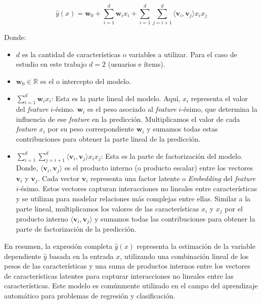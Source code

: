 \documentclass[11pt,a4paper,twoside]{thesis}
\begin{document}
\begin{equation}
	\hat{y}(x) = \mathbf{w}_0 + \sum_{i=1}^d \mathbf{w}_i x_i + \sum_{i=1}^d\sum_{j=i+1}^d
	\langle\mathbf{v}_i, \mathbf{v}_j\rangle x_i x_j
\end{equation}
\begin{description}
	\item[Donde:]
\end{description}
\begin{itemize}
	\item $d$ es la cantidad de características o variables a utilizar.
	      Para el caso de estudio en este trabajo $d=2$ (usuarios e ítems).
	\item $\mathbf{w}_0 \in \mathbb{R}$ es el  o intercepto del modelo.
	\item $\sum_{i=1}^d \mathbf{w}_i x_i$: Esta es la parte lineal del modelo. Aquí,
	      $x_i$ representa el valor del \textit{feature} $i$-ésimo. $\mathbf{w}_i$ es
	      el peso asociado al \textit{feature} $i$-ésimo, que determina la influencia
	      de ese \textit{feature} en la predicción. Multiplicamos el valor de cada
	      \textit{feature} $x_i$ por su peso correspondiente $\mathbf{w}_i$ y sumamos
	      todas estas contribuciones para obtener la parte lineal de la predicción.
	\item $\sum_{i=1}^d\sum_{j=i+1}^d \langle\mathbf{v}_i, \mathbf{v}_j\rangle x_i x_j$:
	      Esta es la parte de factorización del modelo. Donde, $\langle\mathbf{v}_i,
		      \mathbf{v}_j\rangle$ es el producto interno (o producto escalar) entre
	      los vectores $\mathbf{v}_i$ y $\mathbf{v}_j$. Cada vector $\mathbf{v}_i$
	      representa una factor latente o \textit{Embedding} del \textit{feature}
	      $i$-ésimo. Estos vectores capturan interacciones no lineales entre
	      características y se utilizan para modelar relaciones más complejas
	      entre ellas. Similar a la parte lineal, multiplicamos los valores
	      de las características $x_i$ y $x_j$ por el producto interno
	      $\langle\mathbf{v}_i, \mathbf{v}_j\rangle$ y sumamos todas las contribuciones
	      para obtener la parte de factorización de la predicción.

\end{itemize}

En resumen, la expresión completa $\hat{y}(x)$ representa la estimación de la
variable dependiente $\hat{y}$ basada en la entrada $x$, utilizando una
combinación lineal de los pesos de las características y una suma de productos
internos entre los vectores de características latentes para capturar
interacciones no lineales entre las características. Este modelo es comúnmente
utilizado en el campo del aprendizaje automático para problemas de regresión y
clasificación.
\end{document}
